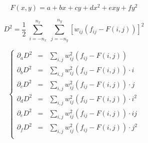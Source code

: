 \documentclass[aps,11pt]{revtex4}
\begin{document}
\begin{equation}
F(x,y) = a + b x + c y + d x^2 + e xy + f y^2
\end{equation}

\begin{equation}
	D^2 = \dfrac{1}{2} \; \sum_{i=-n_x}^{n_x} \; \sum_{j=-n_y}^{n_y} 
	\left[w_{ij} \left(f_{ij} - F(i,j) \right) \right]^2
\end{equation}

\begin{equation}
\left\lbrace
\begin{array}{rcl}
	\partial_a D^2 & = & \displaystyle \sum_{i,j} w_{ij}^2 \left(f_{ij} - F(i,j) \right)   \\
	\partial_b D^2 & = & \displaystyle \sum_{i,j} w_{ij}^2 \left(f_{ij} - F(i,j) \right) \cdot i \\
	\partial_c D^2 & = & \displaystyle \sum_{i,j} w_{ij}^2 \left(f_{ij} - F(i,j) \right) \cdot j \\
 	\partial_d D^2 & = & \displaystyle \sum_{i,j} w_{ij}^2 \left(f_{ij} - F(i,j) \right) \cdot i^2\\
	\partial_e D^2 & = & \displaystyle \sum_{i,j} w_{ij}^2 \left(f_{ij} - F(i,j) \right) \cdot ij\\
	\partial_f D^2 & = & \displaystyle \sum_{i,j} w_{ij}^2 \left(f_{ij} - F(i,j) \right) \cdot j^2 \\
\end{array}
\right.
\end{equation}
\end{document}
